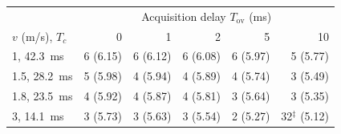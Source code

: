 \begin{tabular}{lrrrrr}
\toprule
& \multicolumn{5}{c}{Acquisition delay $T_{\mathrm{ov}}$ (ms)} \\
$v$ (m/s), $T_c$ & 0 & 1 & 2 & 5 & 10 \\
\midrule
1, 42.3~ms & 6 (6.15) & 6 (6.12) & 6 (6.08) & 6 (5.97) & 5 (5.77) \\
1.5, 28.2~ms & 5 (5.98) & 4 (5.94) & 4 (5.89) & 4 (5.74) & 3 (5.49) \\
1.8, 23.5~ms & 4 (5.92) & 4 (5.87) & 4 (5.81) & 3 (5.64) & 3 (5.35) \\
3, 14.1~ms & 3 (5.73) & 3 (5.63) & 3 (5.54) & 2 (5.27) & 32$^\ddagger$ (5.12) \\
\bottomrule
\end{tabular}
